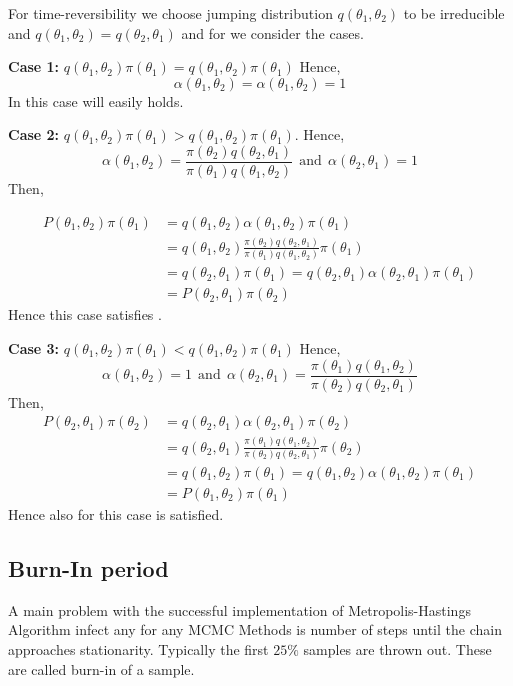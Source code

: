  For time-reversibility we choose jumping distribution $ q(\theta_1,\theta_2) $ to be irreducible and $ q(\theta_1,\theta_2) = q(\theta_2,\theta_1) $ and for  we consider the cases.

\textbf{Case 1:} $ q(\theta_1,\theta_2)\pi(\theta_1) = q(\theta_1,\theta_2)\pi(\theta_1)$ 
Hence, $$ \alpha(\theta_1,\theta_2) = \alpha(\theta_1,\theta_2) = 1 $$
In this case  will easily holds.

\textbf{Case 2:} $ q(\theta_1,\theta_2)\pi(\theta_1) > q(\theta_1,\theta_2)\pi(\theta_1)$.
Hence,
\[
    \alpha(\theta_1,\theta_2) = \frac{\pi(\theta_2)q(\theta_2,\theta_1)}{\pi(\theta_1)q(\theta_1,\theta_2)} \ \ \text{and} \ \ \alpha(\theta_2,\theta_1) = 1
\]
Then,

\begin{align*}
    P(\theta_1,\theta_2)\pi(\theta_1) &= q(\theta_1,\theta_2)\alpha(\theta_1,\theta_2) \pi(\theta_1) \\ 
    &= q(\theta_1,\theta_2) \frac{\pi(\theta_2)q(\theta_2,\theta_1)}{\pi(\theta_1)q(\theta_1,\theta_2)} \pi(\theta_1) \\
    &= q(\theta_2,\theta_1) \pi(\theta_1) = q(\theta_2,\theta_1) \alpha(\theta_2,\theta_1) \pi(\theta_1) \\ 
    &= P(\theta_2,\theta_1) \pi(\theta_2)
\end{align*}
Hence this case satisfies .

\textbf{Case 3:} $ q(\theta_1,\theta_2)\pi(\theta_1) < q(\theta_1,\theta_2)\pi(\theta_1)$
Hence,
\[
 \alpha(\theta_1,\theta_2) = 1  \ \ \text{and} \ \  \alpha(\theta_2,\theta_1) = \frac{\pi(\theta_1)q(\theta_1,\theta_2)}{\pi(\theta_2)q(\theta_2,\theta_1)} 
\]
Then,
\begin{align*}
    P(\theta_2,\theta_1)\pi(\theta_2) &= q(\theta_2,\theta_1)\alpha(\theta_2,\theta_1)\pi(\theta_2) \\ 
                                      &= q(\theta_2,\theta_1) \frac{\pi(\theta_1)q(\theta_1,\theta_2)}{\pi(\theta_2)q(\theta_2,\theta_1)} \pi(\theta_2) \\ 
                                      &= q(\theta_1,\theta_2) \pi(\theta_1) = q(\theta_1,\theta_2) \alpha(\theta_1,\theta_2) \pi(\theta_1) \\ 
                                      &=P(\theta_1,\theta_2) \pi(\theta_1)
\end{align*}
Hence also for this case  is satisfied.

\subsection{Burn-In period}
A main problem with the successful implementation of Metropolis-Hastings Algorithm infect any for any MCMC Methods is number of steps until the chain approaches stationarity.
Typically the first $ 25\% $ samples are thrown out. These are called burn-in of a sample.

